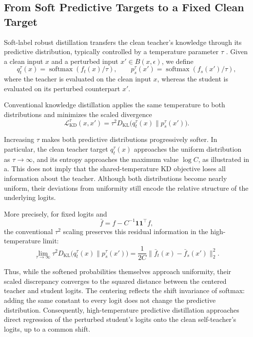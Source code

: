 \documentclass{article} %
\theoremstyle{plain}
\begin{document}
\subsection{From Soft Predictive Targets to a Fixed Clean Target}
\label{sec:fragile}

Soft-label robust distillation transfers the clean teacher's knowledge through
its predictive distribution, typically controlled by a temperature parameter
\(\tau\) \citep{ard,rslad,adr,bmtard}.
Given a clean input \(x\) and a perturbed input
\(x'\in B(x,\epsilon)\), we define
\begin{equation}
q_t^\tau(x)
=
\operatorname{softmax}(f_t(x)/\tau),
\qquad
p_s^\tau(x')
=
\operatorname{softmax}(f_s(x')/\tau),
\label{eqn:soft_targets}
\end{equation}
where the teacher is evaluated on the clean input \(x\), whereas the student
is evaluated on its perturbed counterpart \(x'\).

Conventional knowledge distillation applies the same temperature to both
distributions and minimizes the scaled divergence
\begin{equation}
\mathcal L_{\mathrm{KD}}^\tau(x,x')
=
\tau^2
D_{\mathrm{KL}}
\bigl(q_t^\tau(x)\|p_s^\tau(x')\bigr).
\label{eqn:kd_variants}
\end{equation}

Increasing \(\tau\) makes both predictive distributions progressively softer.
In particular, the clean teacher target \(q_t^\tau(x)\) approaches the
uniform distribution as \(\tau\to\infty\), and its entropy approaches the
maximum value \(\log C\), as illustrated in
a.
This does not imply that the shared-temperature KD objective loses all
information about the teacher.
Although both distributions become nearly uniform, their deviations from
uniformity still encode the relative structure of the underlying logits.

More precisely, for fixed logits and
\[
\bar f
=
f-C^{-1}\mathbf 1\mathbf 1^\top f,
\]
the conventional \(\tau^2\) scaling preserves this residual information in
the high-temperature limit:
\begin{equation}
\lim_{\tau\to\infty}
\tau^2
D_{\mathrm{KL}}
\bigl(q_t^\tau(x)\|p_s^\tau(x')\bigr)
=
\frac{1}{2C}
\lVert
\bar f_t(x)-\bar f_s(x')
\rVert_2^2.
\label{eqn:kd_limit}
\end{equation}

Thus, while the softened probabilities themselves approach uniformity, their
scaled discrepancy converges to the squared distance between the centered
teacher and student logits.
The centering reflects the shift invariance of softmax: adding the same
constant to every logit does not change the predictive distribution.
Consequently, high-temperature predictive distillation approaches direct
regression of the perturbed student's logits onto the clean self-teacher's
logits, up to a common shift.
\end{document}
